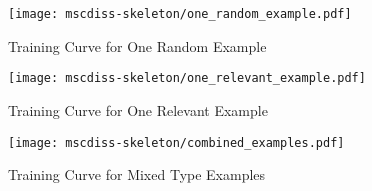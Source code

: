 \documentclass[logo,msc]{infthesis}           %
\begin{document}
\begin{figure}[H]
    \centering
    \begin{minipage}[b]{0.32\textwidth}
        \centering
        \texttt{[image: mscdiss-skeleton/one\_random\_example.pdf]}
        \caption{Training Curve for One Random Example}
        \label{fig:random-example}
    \end{minipage}
    \hfill %
    \begin{minipage}[b]{0.32\textwidth}
        \centering
        \texttt{[image: mscdiss-skeleton/one\_relevant\_example.pdf]}
        \caption{Training Curve for One Relevant Example}
        \label{fig:relevant-example}
    \end{minipage}
    \hfill %
    \begin{minipage}[b]{0.32\textwidth}
        \centering
        \texttt{[image: mscdiss-skeleton/combined\_examples.pdf]}
        \caption{Training Curve for Mixed Type Examples}
        \label{fig:mixed-examples}
    \end{minipage}
\end{figure}








\end{document}
